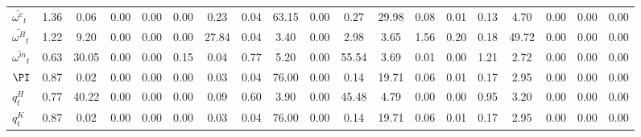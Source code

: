\begin{center}
\begin{longtable}{lcccccccccccccccccc}
$ \bar{\omega^e}_t  $	 & 	             1.36	 & 	             0.06	 & 	             0.00	 & 	             0.00	 & 	             0.00	 & 	             0.23	 & 	             0.04	 & 	            63.15	 & 	             0.00	 & 	             0.27	 & 	            29.98	 & 	             0.08	 & 	             0.01	 & 	             0.13	 & 	             4.70	 & 	             0.00	 & 	             0.00	 & 	             0.00 \\ 
$ \bar{\omega^B}_t  $	 & 	             1.22	 & 	             9.20	 & 	             0.00	 & 	             0.00	 & 	             0.00	 & 	            27.84	 & 	             0.04	 & 	             3.40	 & 	             0.00	 & 	             2.98	 & 	             3.65	 & 	             1.56	 & 	             0.20	 & 	             0.18	 & 	            49.72	 & 	             0.00	 & 	             0.00	 & 	             0.00 \\ 
$ \bar{\omega^m}_t  $	 & 	             0.63	 & 	            30.05	 & 	             0.00	 & 	             0.00	 & 	             0.15	 & 	             0.04	 & 	             0.77	 & 	             5.20	 & 	             0.00	 & 	            55.54	 & 	             3.69	 & 	             0.01	 & 	             0.00	 & 	             1.21	 & 	             2.72	 & 	             0.00	 & 	             0.00	 & 	             0.00 \\ 
$ \PI               $	 & 	             0.87	 & 	             0.02	 & 	             0.00	 & 	             0.00	 & 	             0.00	 & 	             0.03	 & 	             0.04	 & 	            76.00	 & 	             0.00	 & 	             0.14	 & 	            19.71	 & 	             0.06	 & 	             0.01	 & 	             0.17	 & 	             2.95	 & 	             0.00	 & 	             0.00	 & 	             0.00 \\ 
$ q^H_t             $	 & 	             0.77	 & 	            40.22	 & 	             0.00	 & 	             0.00	 & 	             0.00	 & 	             0.09	 & 	             0.60	 & 	             3.90	 & 	             0.00	 & 	            45.48	 & 	             4.79	 & 	             0.00	 & 	             0.00	 & 	             0.95	 & 	             3.20	 & 	             0.00	 & 	             0.00	 & 	             0.00 \\ 
$  q^K_t            $	 & 	             0.87	 & 	             0.02	 & 	             0.00	 & 	             0.00	 & 	             0.00	 & 	             0.03	 & 	             0.04	 & 	            76.00	 & 	             0.00	 & 	             0.14	 & 	            19.71	 & 	             0.06	 & 	             0.01	 & 	             0.17	 & 	             2.95	 & 	             0.00	 & 	             0.00	 & 	             0.00 \\ 

\end{longtable}
\end{center}
